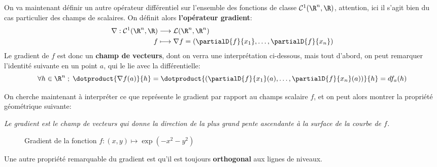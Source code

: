 \subsection*{}
On va maintenant définir un autre opérateur différentiel sur l'ensemble des fonctions de classe \(\mathcal{C}^1(\R^n, \R)\), attention, ici il s'agit bien du cas particulier des champs de scalaires. On définit alors \textbf{l'opérateur gradient}:
\[
   \begin{aligned}
      \nabla : \mathcal{C}^1(\R^n, \R) &\longrightarrow \mathcal{L}(\R^n, \R^n)\\
      f &\longmapsto \nabla f = \left(\partialD{f}{x_1}, \ldots, \partialD{f}{x_n}\right)
   \end{aligned}
\]
Le gradient de \(f\) est donc un \textbf{champ de vecteurs}, dont on verra une interprétation ci-dessous, mais tout d'abord, on peut remarquer l'identité suivante en un point \(a\), qui le lie avec la différentielle:
\[
   \forall h \in \R^n \; ; \; \dotproduct{\nabla f(a)}{h} = \dotproduct{\left(\partialD{f}{x_1}(a), \ldots, \partialD{f}{x_n}(a)\right)}{h} = df_a(h)
\]

On cherche maintenant à interpréter ce que représente le gradient par rapport au champs scalaire \(f\), et on peut alors montrer la propriété géométrique suivante:
\begin{center}
   \textit{Le gradient est le champ de vecteurs qui donne la direction de la plus grand pente ascendante à la surface de la courbe de \(f\).}
\end{center}
\begin{figure}[h]
   \centering
   \vspace*{-0.5mm}
   \captionsetup{labelformat=empty}
   \caption{Gradient de la fonction \(f : (x, y) \mapsto \exp(-x^2 - y^2)\)}
\end{figure}
Une autre propriété remarquable du gradient est qu'il est toujours \textbf{orthogonal} aux lignes de niveaux.

